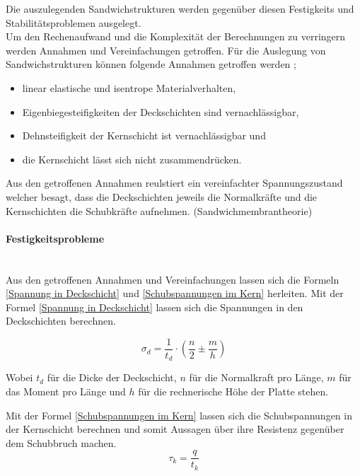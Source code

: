  Die auszulegenden Sandwichstrukturen werden gegenüber diesen Festigkeits und Stabilitätsproblemen ausgelegt.\\
  Um den Rechenaufwand und die Komplexität der Berechnungen zu verringern werden Annahmen und Vereinfachungen getroffen. Für die Auslegung von Sandwichstrukturen können folgende Annahmen getroffen werden \cite{klein}\cite{ETH};
  \begin{itemize}
    \item linear elastische und isentrope Materialverhalten,
    \item Eigenbiegesteifigkeiten der Deckschichten sind vernachlässigbar,
    \item Dehnsteifigkeit der Kernschicht ist vernachlässigbar und
    \item die Kernschicht lässt sich nicht zusammendrücken.\\
  \end{itemize}
  Aus den getroffenen Annahmen reulstiert ein vereinfachter Spannungszustand welcher besagt, dass die Deckschichten jeweils die Normalkräfte und die Kernschichten die Schubkräfte aufnehmen. (Sandwichmembrantheorie)

    \paragraph{Festigkeitsprobleme}\mbox{}\\
    Aus den getroffenen Annahmen und Vereinfachungen lassen sich die Formeln \ref{Spannung in Deckschicht} und \ref{Schubspannungen im Kern} herleiten. Mit der Formel \ref{Spannung in Deckschicht} lassen sich die Spannungen in den Deckschichten berechnen.

    \begin{equation}
      \label{Spannung in Deckschicht}
      \sigma_d = \frac{1}{t_d}\cdot \left ( \frac{n}{2} \pm \frac{m}{h}\right )
    \end{equation}

    Wobei $t_d$ für die Dicke der Deckschicht, $n$ für die Normalkraft pro Länge, $m$ für das Moment pro Länge und $h$ für die rechnerische Höhe der Platte stehen.

    Mit der Formel \ref{Schubspannungen im Kern} lassen sich die Schubspannungen in der Kernschicht berechnen und somit Aussagen über ihre Resistenz gegenüber dem Schubbruch machen.
    \begin{equation}
      \label{Schubspannungen im Kern}
      \tau_k = \frac{q}{t_k}
    \end{equation}

